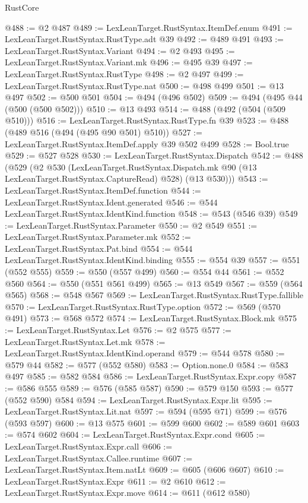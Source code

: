 \begin{lexlean}{RustCore}
\begin{coremodule}
@488 := @2 @487
@489 := LexLeanTarget.RustSyntax.ItemDef.enum
@491 := LexLeanTarget.RustSyntax.RustType.adt @39
@492 := @489 @491
@493 := LexLeanTarget.RustSyntax.Variant
@494 := @2 @493
@495 := LexLeanTarget.RustSyntax.Variant.mk
@496 := @495 @39
@497 := LexLeanTarget.RustSyntax.RustType
@498 := @2 @497
@499 := LexLeanTarget.RustSyntax.RustType.nat
@500 := @498 @499
@501 := @13 @497
@502 := @500 @501
@504 := @494 (@496 @502)
@509 := @494 (@495 @44 (@500 (@500 @502)))
@510 := @13 @493
@514 := @488 (@492 (@504 (@509 @510)))
@516 := LexLeanTarget.RustSyntax.RustType.fn @39
@523 := @488 (@489 @516 (@494 (@495 @90 @501) @510))
@527 := LexLeanTarget.RustSyntax.ItemDef.apply @39 @502 @499
@528 := Bool.true
@529 := @527 @528
@530 := LexLeanTarget.RustSyntax.Dispatch
@542 := @488
    (@529
      (@2
        @530
        (LexLeanTarget.RustSyntax.Dispatch.mk @90 (@13 LexLeanTarget.RustSyntax.CaptureRead) @528)
        (@13 @530)))
@543 := LexLeanTarget.RustSyntax.ItemDef.function
@544 := LexLeanTarget.RustSyntax.Ident.generated
@546 := @544 LexLeanTarget.RustSyntax.IdentKind.function
@548 := @543 (@546 @39)
@549 := LexLeanTarget.RustSyntax.Parameter
@550 := @2 @549
@551 := LexLeanTarget.RustSyntax.Parameter.mk
@552 := LexLeanTarget.RustSyntax.Pat.bind
@554 := @544 LexLeanTarget.RustSyntax.IdentKind.binding
@555 := @554 @39
@557 := @551 (@552 @555)
@559 := @550 (@557 @499)
@560 := @554 @44
@561 := @552 @560
@564 := @550 (@551 @561 @499)
@565 := @13 @549
@567 := @559 (@564 @565)
@568 := @548 @567
@569 := LexLeanTarget.RustSyntax.RustType.fallible
@570 := LexLeanTarget.RustSyntax.RustType.option
@572 := @569 (@570 @491)
@573 := @568 @572
@574 := LexLeanTarget.RustSyntax.Block.mk
@575 := LexLeanTarget.RustSyntax.Let
@576 := @2 @575
@577 := LexLeanTarget.RustSyntax.Let.mk
@578 := LexLeanTarget.RustSyntax.IdentKind.operand
@579 := @544 @578
@580 := @579 @44
@582 := @577 (@552 @580)
@583 := Option.none.{0}
@584 := @583 @497
@585 := @582 @584
@586 := LexLeanTarget.RustSyntax.Expr.copy
@587 := @586 @555
@589 := @576 (@585 @587)
@590 := @579 @150
@593 := @577 (@552 @590) @584
@594 := LexLeanTarget.RustSyntax.Expr.lit
@595 := LexLeanTarget.RustSyntax.Lit.nat
@597 := @594 (@595 @71)
@599 := @576 (@593 @597)
@600 := @13 @575
@601 := @599 @600
@602 := @589 @601
@603 := @574 @602
@604 := LexLeanTarget.RustSyntax.Expr.cond
@605 := LexLeanTarget.RustSyntax.Expr.call
@606 := LexLeanTarget.RustSyntax.Callee.runtime
@607 := LexLeanTarget.RustSyntax.Item.natLt
@609 := @605 (@606 @607)
@610 := LexLeanTarget.RustSyntax.Expr
@611 := @2 @610
@612 := LexLeanTarget.RustSyntax.Expr.move
@614 := @611 (@612 @580)

\end{coremodule}
\end{lexlean}
